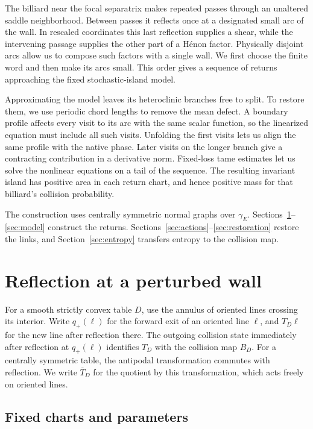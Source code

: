 \documentclass[11pt]{article}
\begin{document}
The billiard near the focal separatrix makes repeated passes through
an unaltered saddle neighborhood. Between passes it reflects once at a
designated small arc of the wall. In rescaled coordinates this last
reflection supplies a shear, while the intervening passage supplies
the other part of a H\'enon factor. Physically disjoint arcs allow us
to compose such factors with a single wall. We first choose the finite
word and then make its arcs small. This order gives a sequence of
returns approaching the fixed stochastic-island model.

Approximating the model leaves its heteroclinic branches free to split.
To restore them, we use periodic chord lengths to remove the mean
defect. A boundary profile affects every visit to its arc with the same
scalar function, so the linearized equation must include all such
visits. Unfolding the first
visits lets us align the same profile with the native phase. Later visits
on the longer branch give a contracting contribution in a derivative
norm. Fixed-loss tame estimates let us solve the
nonlinear equations on a tail of the sequence. The resulting invariant
island has positive area in each return chart, and hence positive mass
for that billiard's collision probability.

The construction uses centrally symmetric normal graphs over
\(\gamma_E\). Sections~\ref{sec:reflection}--\ref{sec:model} construct
the returns. Sections~\ref{sec:actions}--\ref{sec:restoration} restore the
links, and Section~\ref{sec:entropy} transfers entropy to the collision map.


\section{Reflection at a perturbed wall}\label{sec:reflection}

For a smooth strictly convex table \(D\), use the annulus of oriented lines crossing
its interior. Write \(q_+(\ell)\) for the forward exit of an oriented
line \(\ell\), and \(T_D\ell\) for the new line after reflection there.
The outgoing collision state immediately after reflection at
\(q_+(\ell)\) identifies \(T_D\) with the collision map \(B_D\).
For a centrally symmetric table, the antipodal transformation commutes
with reflection. We write \(\overline T_D\) for the quotient by this
transformation, which acts freely on oriented lines.

\subsection{Fixed charts and parameters}\label{fixed-charts-and-parameters}
\end{document}
